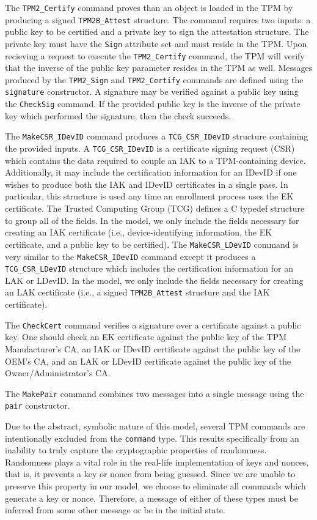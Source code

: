 The \verb|TPM2_Certify| command proves than an object is loaded in the TPM by producing a signed \verb|TPM2B_Attest| structure. The command requires two inputs: a public key to be certified and a private key to sign the attestation structure. The private key must have the \verb|Sign| attribute set and must reside in the TPM. Upon recieving a request to execute the \verb|TPM2_Certify| command, the TPM will verify that the inverse of the public key parameter resides in the TPM as well. Messages produced by the \verb|TPM2_Sign| and \verb|TPM2_Certify| commands are defined using the \verb|signature| constructor. A signature may be verified against a public key using the \verb|CheckSig| command. If the provided public key is the inverse of the private key which performed the signature, then the check succeeds.

The \verb|MakeCSR_IDevID| command produces a \verb|TCG_CSR_IDevID| structure containing the provided inputs. 
 A \verb|TCG_CSR_IDevID| is a certificate signing request (CSR) which contains the data required to couple an IAK to a TPM-containing device. Additionally, it may include the certification information for an IDevID if one wishes to produce both the IAK and IDevID certificates in a single pass. In particular, this structure is used any time an enrollment process uses the EK certificate. The Trusted Computing Group (TCG) defines a C typedef structure to group all of the fields. In the model, we only include the fields necessary for creating an IAK certificate (i.e., device-identifying information, the EK certificate, and a public key to be certified). The \verb|MakeCSR_LDevID| command is very similar to the \verb|MakeCSR_IDevID| command except it produces a \verb|TCG_CSR_LDevID| structure which includes the certification information for an LAK or LDevID. In the model, we only include the fields necessary for creating an LAK certificate (i.e., a signed \verb|TPM2B_Attest| structure and the IAK certificate).

The \verb|CheckCert| command verifies a signature over a certificate against a public key. One should check an EK certificate against the public key of the TPM Manufacturer's CA, an IAK or IDevID certificate against the public key of the OEM's CA, and an LAK or LDevID certificate against the public key of the Owner/Administrator's CA.

The \verb|MakePair| command combines two messages into a single message using the \verb|pair| constructor.




Due to the abstract, symbolic nature of this model, several TPM commands are intentionally excluded from the \verb|command| type. This results specifically from an inability to truly capture the cryptographic properties of randomness. Randomness plays a vital role in the real-life implementation of keys and nonces, that is, it prevents a key or nonce from being guessed. Since we are unable to preserve this property in our model, we choose to eliminate all commands which generate a key or nonce. Therefore, a message of either of these types must be inferred from some other message or be in the initial state. 

